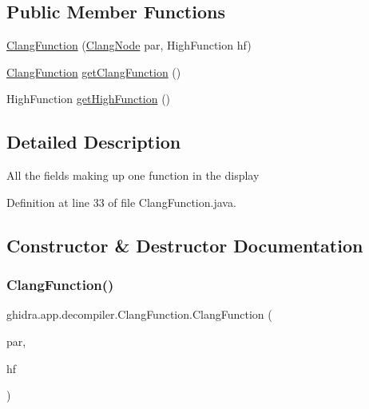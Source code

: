 \subsection*{Public Member Functions}
\begin{DoxyCompactItemize}
\item 
\mbox{\hyperlink{classghidra_1_1app_1_1decompiler_1_1_clang_function_a516539f18d1eeaa7254faa9d4578bceb}{Clang\+Function}} (\mbox{\hyperlink{interfaceghidra_1_1app_1_1decompiler_1_1_clang_node}{Clang\+Node}} par, High\+Function hf)
\item 
\mbox{\hyperlink{classghidra_1_1app_1_1decompiler_1_1_clang_function}{Clang\+Function}} \mbox{\hyperlink{classghidra_1_1app_1_1decompiler_1_1_clang_function_aa327efcad2a0070511834a9edb1fc270}{get\+Clang\+Function}} ()
\item 
High\+Function \mbox{\hyperlink{classghidra_1_1app_1_1decompiler_1_1_clang_function_af1f2a880d7e39b1df3a611b95ff62910}{get\+High\+Function}} ()
\end{DoxyCompactItemize}


\subsection{Detailed Description}
All the fields making up one function in the display 

Definition at line 33 of file Clang\+Function.\+java.



\subsection{Constructor \& Destructor Documentation}
\mbox{\label{classghidra_1_1app_1_1decompiler_1_1_clang_function_a516539f18d1eeaa7254faa9d4578bceb}} 
\subsubsection{\texorpdfstring{ClangFunction()}{ClangFunction()}}
{\footnotesize\ttfamily ghidra.\+app.\+decompiler.\+Clang\+Function.\+Clang\+Function (\begin{DoxyParamCaption}\item[{\mbox{\hyperlink{interfaceghidra_1_1app_1_1decompiler_1_1_clang_node}{Clang\+Node}}}]{par,  }\item[{High\+Function}]{hf }\end{DoxyParamCaption})\hspace{0.3cm}{\ttfamily [inline]}}



